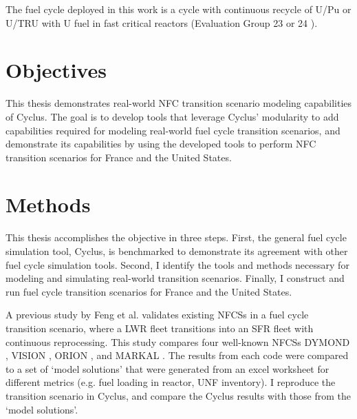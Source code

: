The fuel cycle deployed in this work is a cycle with
continuous recycle of U/Pu or U/TRU with U fuel in fast critical reactors
(Evaluation Group 23 or 24 \cite{wigeland_nuclear_2014}).

\section{Objectives}

This thesis demonstrates real-world \gls{NFC} transition
scenario modeling capabilities of Cyclus. The goal is to
develop tools that leverage Cyclus' modularity to
add capabilities required for modeling real-world
fuel cycle transition scenarios, and demonstrate its
capabilities by using the developed tools to perform
\gls{NFC} transition scenarios for France and the United
States.

\section{Methods}
This thesis accomplishes the objective in three steps. First,
the general fuel cycle simulation tool, Cyclus, is benchmarked
to demonstrate its agreement with other fuel cycle simulation
tools. Second, I identify the tools and methods necessary
for modeling and simulating real-world transition scenarios.
Finally, I construct and run fuel cycle transition scenarios
for France and the United States.

A previous study by Feng et al. \cite{feng_standardized_2016} validates existing 
\glspl{NFCS} in a fuel cycle transition scenario, where a \gls{LWR} fleet
transitions into an \gls{SFR} fleet with continuous reprocessing. This 
study compares four well-known \glspl{NFCS}
DYMOND \cite{yacout_modeling_2005},
VISION \cite{jacobson_verifiable_2010},
ORION \cite{gregg_analysis_2012}, and
MARKAL \cite{shay_epa_2006}. The results from each code were
compared to a set of `model solutions' that were generated
from an excel worksheet for different metrics (e.g. fuel loading
in reactor, \gls{UNF} inventory). I reproduce the transition
scenario in Cyclus, and compare the Cyclus results with those
from the `model solutions'.

